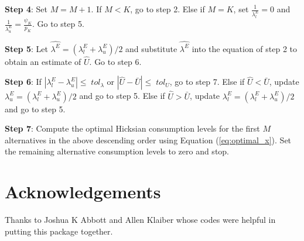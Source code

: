 \textbf{Step 4}: Set \(M=M+1\). If \(M<K\), go to step 2. Else if
\(M=K\), set \(\frac{1}{\lambda_l^E}= 0\) and
\(\frac{1}{\lambda_u^E}= \frac{\psi_{K}}{p_{K}}\). Go to step 5.

\textbf{Step 5}: Let \(\hat{\lambda^E}= (\lambda_l^E+\lambda_u^E)/2\)
and substitute \(\hat{\lambda^E}\) into the equation of step 2 to obtain
an estimate of \(\hat{U}\). Go to step 6.

\textbf{Step 6}: If \(|\lambda_l^E-\lambda_u^E| \leq \; tol_{\lambda}\)
or \(|\hat{U}-\bar{U}| \leq \; tol_{U}\), go to step 7. Else if
\(\hat{U}<\bar{U}\), update \(\lambda^E_u= (\lambda_l^E+\lambda_u^E)/2\)
and go to step 5. Else if \(\hat{U}>\bar{U}\), update
\(\lambda^E_l= (\lambda_l^E+\lambda_u^E)/2\) and go to step 5.

\textbf{Step 7}: Compute the optimal Hicksian consumption levels for the
first \(M\) alternatives in the above descending order using Equation
(\ref{eq:optimal_x}). Set the remaining alternative consumption levels
to zero and stop.

\hypertarget{acknowledgements}{%
\section{Acknowledgements}\label{acknowledgements}}

Thanks to Joshua K Abbott and Allen Klaiber whose codes were helpful in
putting this package together.




\address{%
Patrick Lloyd-Smith\\
University of Saskatchewan\\%
Department of Agricultural and Resource Economics \\
Global Institute for Water Security \\
Room 3D34, Agriculture Building 51 Campus Drive \\
Saskatoon, SK S7N 5A8 Canada\\
%
\url{https://plloydsmith.github.io/}%
%
\\
}

